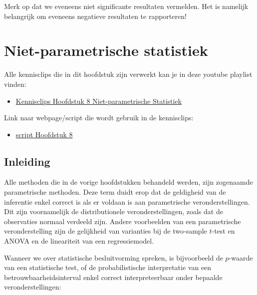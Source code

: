 \documentclass[
  12pt,dutch,coursenotes]{book}
\providecommand{\tightlist}{%
  \setlength{\itemsep}{0pt}\setlength{\parskip}{0pt}}
\theoremstyle{definition}
\theoremstyle{definition}
\theoremstyle{definition}
\theoremstyle{remark}
\begin{document}
Merk op dat we eveneens niet significante resultaten vermelden. Het is namelijk belangrijk om eveneens negatieve resultaten te rapporteren!

\hypertarget{niet-parametrische-statistiek}{%
\chapter{Niet-parametrische statistiek}\label{niet-parametrische-statistiek}}

Alle kennisclips die in dit hoofdstuk zijn verwerkt kan je in deze youtube playlist vinden:

\begin{itemize}
\tightlist
\item
  \href{https://www.youtube.com/playlist?list=PLZH1hP8_LbJJyR4mqLOxDwwOzysbhaFm1}{Kennisclips Hoofdstuk 8 Niet-parametrische Statistiek}
\end{itemize}

Link naar webpage/script die wordt gebruik in de kennisclips:

\begin{itemize}
\tightlist
\item
  \href{https://statomics.github.io/sbc20/rmd/08-NonparametericStatistics.html}{script Hoofdstuk 8}
\end{itemize}

\hypertarget{inleiding-7}{%
\section{Inleiding}\label{inleiding-7}}

Alle methoden die in de vorige hoofdstukken behandeld werden, zijn zogenaamde parametrische methoden. Deze term duidt erop dat de geldigheid van de inferentie enkel correct is als er voldaan is aan parametrische veronderstellingen.
Dit zijn voornamelijk de distributionele veronderstellingen, zoals dat de observaties normaal verdeeld zijn. Andere
voorbeelden van een parametrische veronderstelling zijn de gelijkheid van varianties bij de two-sample \(t\)-test en ANOVA en de lineariteit van een regressiemodel.

Wanneer we over statistische besluitvorming spreken, is bijvoorbeeld de \(p\)-waarde van een statistische test, of de probabilistische interpretatie van een betrouwbaarheidsinterval enkel correct interpreteerbaar onder bepaalde veronderstellingen:
\end{document}
